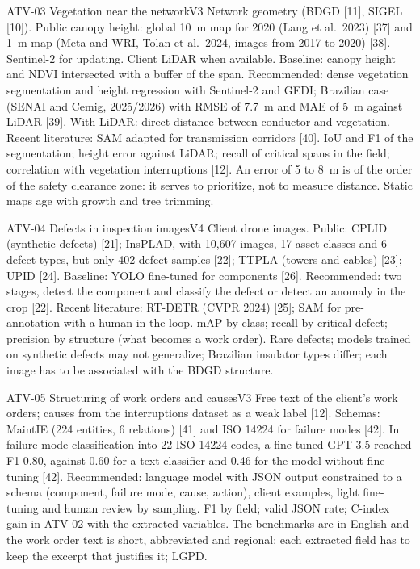 \begin{ficha}{ATV-03 \textperiodcentered{} Vegetation near the network}{V3}
 Network geometry (BDGD [11], SIGEL [10]). Public canopy
height: global 10~m map for 2020 (Lang et al.\ 2023) [37] and 1~m map
(Meta and WRI, Tolan et al.\ 2024, images from 2017 to 2020) [38]. Sentinel-2
for updating. Client LiDAR when available.
 Baseline: canopy height and NDVI intersected with a
buffer of the span. Recommended: dense vegetation segmentation and height
regression with Sentinel-2 and GEDI; Brazilian case (SENAI and Cemig, 2025/2026) with
RMSE of 7.7~m and MAE of 5~m against LiDAR [39]. With LiDAR: direct distance
between conductor and vegetation. Recent literature: SAM adapted for transmission
corridors [40].
 IoU and F1 of the segmentation; height error against LiDAR; recall
of critical spans in the field; correlation with vegetation interruptions [12].
 An error of 5 to 8~m is of the order of the safety clearance zone: it serves
to prioritize, not to measure distance. Static maps age with
growth and tree trimming.
\end{ficha}

\begin{ficha}{ATV-04 \textperiodcentered{} Defects in inspection images}{V4}
 Client drone images. Public: CPLID (synthetic
defects) [21]; InsPLAD, with 10,607 images, 17 asset classes and 6 defect
types, but only 402 defect samples [22]; TTPLA (towers and cables) [23];
UPID [24].
 Baseline: YOLO fine-tuned for components [26].
Recommended: two stages, detect the component and classify the defect or
detect an anomaly in the crop [22]. Recent literature: RT-DETR (CVPR 2024) [25];
SAM for pre-annotation with a human in the loop.
 mAP by class; recall by critical defect; precision by
structure (what becomes a work order).
 Rare defects; models trained on synthetic defects
may not generalize; Brazilian
insulator types differ; each image has to be associated with the BDGD
structure.
\end{ficha}

\begin{ficha}{ATV-05 \textperiodcentered{} Structuring of work orders and causes}{V3}
 Free text of the client's work orders; causes from the interruptions
dataset as a weak label [12]. Schemas: MaintIE (224 entities, 6
relations) [41] and ISO 14224 for failure modes [42].
 In failure mode classification into 22 ISO 14224 codes,
a fine-tuned GPT-3.5 reached F1 0.80, against 0.60 for a text
classifier and 0.46 for the model without fine-tuning [42]. Recommended: language model with
JSON output constrained to a schema (component, failure mode, cause, action),
client examples, light fine-tuning and human review by sampling.
 F1 by field; valid JSON rate; C-index gain in ATV-02
with the extracted variables.
 The benchmarks are in English and the work order text is short,
abbreviated and regional; each extracted field has to keep the excerpt that
justifies it; LGPD.
\end{ficha}

